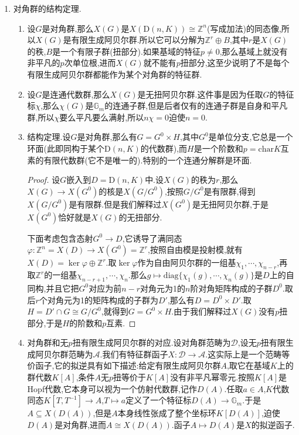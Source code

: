 \begin{enumerate}
\begin{enumerate}[(1)]
\begin{proof}
			\qquad
			
			反过来设$G$是$d$-群.那么存在$X(G)$的有限子集$\{\chi_1,\cdots,\chi_n\}$代数生成了$K[G]$.定义$\varphi:G\to\mathbb{G}_m^{\times n}\cong\mathrm{D}(n,K)$为$g\mapsto(\chi_1(g),\cdots,\chi_n(g))$,这是代数群态射.按照这些$\chi_i$代数生成了整个$K[G]$,所以$\varphi$是单射.于是$G$是对角群.
		\end{proof}
	\end{enumerate}
	\item 对角群的结构定理.
	\begin{enumerate}[(1)]
		\item 设$G$是对角群,那么$X(G)$是$X(\mathrm{D}(n,K))\cong\mathbb{Z}^n$(写成加法)的同态像,所以$X(G)$是有限生成阿贝尔群.所以它可以分解为$\mathbb{Z}^r\oplus B$,其中$r$是$X(G)$的秩,$B$是一个有限子群(扭部分).如果基域的特征$p\not=0$,那么基域上就没有非平凡的$p$次单位根,进而$X(G)$就不能有$p$扭部分,这至少说明了不是每个有限生成阿贝尔群都能作为某个对角群的特征群.
		\item 设$G$是连通代数群,那么$X(G)$是无扭阿贝尔群.这件事是因为任取$G$的特征标$\chi$,那么$\chi(G)$是$\mathbb{G}_m$的连通子群,但是后者仅有的连通子群是自身和平凡群,所以$\chi$要么平凡要么满射,所以$n\chi=0$迫使$n=0$.
		\item 结构定理.设$G$是对角群,那么有$G=G^0\times H$,其中$G^0$是单位分支,它总是一个环面(此即同构于某个$\mathrm{D}(n,K)$的代数群),而$H$是一个阶数和$p=\mathrm{char}K$互素的有限代数群(它不是唯一的).特别的一个连通分解群是环面.
		\begin{proof}
			
			设$G$嵌入到$D=\mathrm{D}(n,K)$中.设$X(G)$的秩为$r$,那么$X(G)\to X(G^0)$的核是$X(G/G^0)$,按照$G/G^0$是有限群,得到$X(G/G^0)$是有限群.但是我们解释过$X(G^0)$是无扭阿贝尔群,于是$X(G^0)$恰好就是$X(G)$的无扭部分.
			
			\qquad
			
			下面考虑包含态射$G^0\to D$,它诱导了满同态$\varphi:\mathbb{Z}^n=X(D)\to X(G^0)=\mathbb{Z}^r$,按照自由模是投射模,就有$X(D)=\ker\varphi\oplus\mathbb{Z}^r$.取$\ker\varphi$作为自由阿贝尔群的一组基$\chi_1,\cdots,\chi_{n-r}$,再取$\mathbb{Z}^r$的一组基$\chi_{n-r+1},\cdots,\chi_n$.那么$g\mapsto\mathrm{diag}\{\chi_1(g),\cdots,\chi_n(g)\}$是$D$上的自同构,并且它把$G^0$对应为前$n-r$对角元为1的$n$阶对角矩阵构成的子群$D^0$.取后$r$个对角元为1的矩阵构成的子群为$D'$,那么有$D=D^0\times D'$.取$H=D'\cap G\cong G/G^0$,就得到$G=G^0\times H$.由于我们解释过$X(G)$没有$p$扭部分,于是$H$的阶数和$p$互素.
		\end{proof}
	    \item 对角群和无$p$扭有限生成阿贝尔群的对应.设对角群范畴为$\mathscr{D}$,设无$p$扭有限生成阿贝尔群范畴为$\mathscr{A}$.我们有特征群函子$X:\mathscr{D}\to\mathscr{A}$.这实际上是一个范畴等价函子,它的拟逆具有如下描述:给定有限生成阿贝尔群$A$,取它在基域$K$上的群代数$K[A]$,条件$A$无$p$扭等价于$K[A]$没有非平凡幂零元.按照$K[A]$是Hopf代数,它本身可以视为一个仿射代数群,记作$D(A)$.任取$a\in A$,$K$代数同态$K[T,T^{-1}]\to A$,$T\mapsto a$定义了一个特征标$D(A)\to\mathbb{G}_m$.于是$A\subseteq X(D(A))$,但是$A$本身线性张成了整个坐标环$K[D(A)]$,迫使$D(A)$是对角群,进而$A\cong X(D(A))$.函子$A\mapsto D(A)$是$X$的拟逆函子.
	\end{enumerate}
\end{enumerate}
